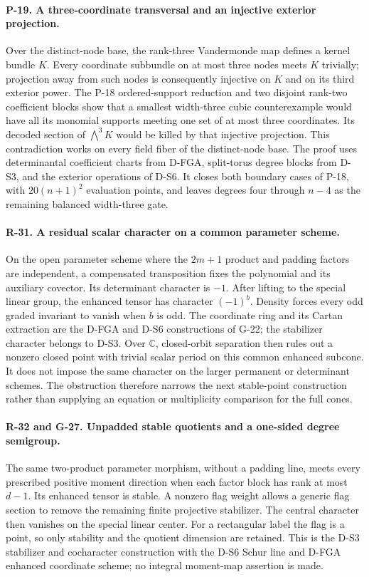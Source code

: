 \paragraph{P-19. A three-coordinate transversal and an injective exterior projection.}
Over the distinct-node base, the rank-three Vandermonde map
defines a kernel bundle $K$. Every coordinate subbundle on at
most three nodes meets $K$ trivially; projection away from such
nodes is consequently injective on $K$ and on its third exterior
power. The P-18 ordered-support reduction and two disjoint
rank-two coefficient blocks show that a smallest width-three
cubic counterexample would have all its monomial supports
meeting one set of at most three coordinates. Its decoded
section of $\bigwedge^3 K$ would be killed by that injective
projection. This contradiction works on every field fiber of
the distinct-node base. The proof uses determinantal coefficient
charts from D-FGA, split-torus degree blocks from D-S3, and the
exterior operations of D-S6. It closes both boundary cases of
P-18, with $20(n+1)^2$ evaluation points, and leaves degrees
four through $n-4$ as the remaining balanced width-three gate.

\paragraph{R-31. A residual scalar character on a common parameter scheme.}
On the open parameter scheme where the $2m+1$ product and
padding factors are independent, a compensated transposition
fixes the polynomial and its auxiliary covector. Its determinant
character is $-1$. After lifting to the special linear group,
the enhanced tensor has character $(-1)^b$. Density forces
every odd graded invariant to vanish when $b$ is odd. The
coordinate ring and its Cartan extraction are the D-FGA and
D-S6 constructions of G-22; the stabilizer character belongs
to D-S3. Over $\mathbb C$, closed-orbit separation then rules
out a nonzero closed point with trivial scalar period on this
common enhanced subcone. It does not impose the same character
on the larger permanent or determinant schemes. The obstruction
therefore narrows the next stable-point construction rather
than supplying an equation or multiplicity comparison for the
full cones.


\paragraph{R-32 and G-27. Unpadded stable quotients and a one-sided degree semigroup.}
The same two-product parameter morphism, without a padding
line, meets every prescribed positive moment direction when
each factor block has rank at most $d-1$. Its enhanced tensor
is stable. A nonzero flag weight allows a generic flag section
to remove the remaining finite projective stabilizer. The
central character then vanishes on the special linear center.
For a rectangular label the flag is a point, so only stability
and the quotient dimension are retained. This is the D-S3
stabilizer and cocharacter construction with the D-S6 Schur
line and D-FGA enhanced coordinate scheme; no integral
moment-map assertion is made.

